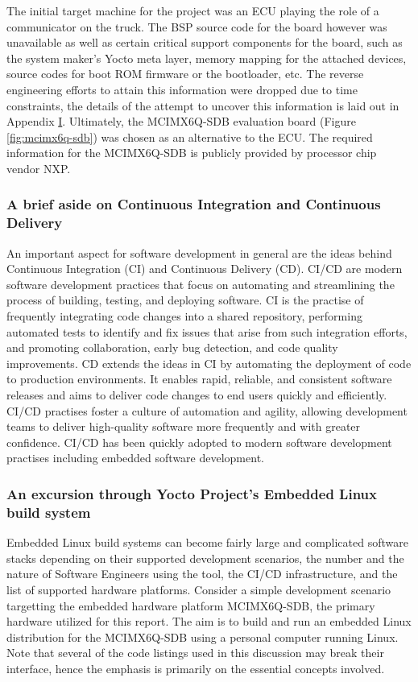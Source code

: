 The initial target machine for the project was an ECU playing the role of a communicator on the truck. The BSP source code for the board however was unavailable as well as certain critical support components for the board, such as the system maker's Yocto meta layer, memory mapping for the attached devices, source codes for boot ROM firmware or the bootloader, etc. The reverse engineering efforts to attain this information were dropped due to time constraints, the details of the attempt to uncover this information is laid out in Appendix \hyperref[rtc-c300]{I}. Ultimately, the MCIMX6Q-SDB evaluation board (Figure \ref{fig:mcimx6q-sdb}) was chosen as an alternative to the ECU. The required information for the MCIMX6Q-SDB is publicly provided by processor chip vendor NXP.

\subsubsection{A brief aside on Continuous Integration and Continuous Delivery}

An important aspect for software development in general are the ideas behind Continuous Integration (CI) and Continuous Delivery (CD). CI/CD are modern software development practices that focus on automating and streamlining the process of building, testing, and deploying software. CI is the practise of frequently integrating code changes into a shared repository, performing automated tests to identify and fix issues that arise from such integration efforts, and promoting collaboration, early bug detection, and code quality improvements. CD extends the ideas in CI by automating the deployment of code to production environments. It enables rapid, reliable, and consistent software releases and aims to deliver code changes to end users quickly and efficiently. CI/CD practises foster a culture of automation and agility, allowing development teams to deliver high-quality software more frequently and with greater confidence. CI/CD has been quickly adopted to modern software development practises including embedded software development.

\subsubsection{An excursion through Yocto Project's Embedded Linux build system}

Embedded Linux build systems can become fairly large and complicated software stacks depending on their supported development scenarios, the number and the nature of Software Engineers using the tool, the CI/CD infrastructure, and the list of supported hardware platforms. Consider a simple development scenario targetting the embedded hardware platform MCIMX6Q-SDB, the primary hardware utilized for this report. The aim is to build and run an embedded Linux distribution for the MCIMX6Q-SDB using a personal computer running Linux. Note that several of the code listings used in this discussion may break their interface, hence the emphasis is primarily on the essential concepts involved.

